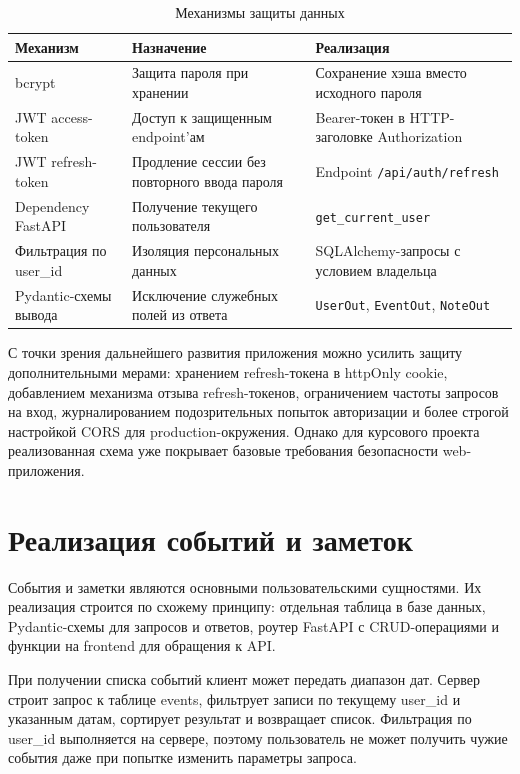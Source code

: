 \documentclass[14pt,a4paper]{extreport}
\begin{document}
\begin{longtable}{|p{}|p{}|p{}|}
\caption{Механизмы защиты данных}\\
\hline
\textbf{Механизм} & \textbf{Назначение} & \textbf{Реализация}\\
\hline
bcrypt & Защита пароля при хранении & Сохранение хэша вместо исходного пароля\\
\hline
JWT access-token & Доступ к защищенным endpoint'ам & Bearer-токен в HTTP-заголовке Authorization\\
\hline
JWT refresh-token & Продление сессии без повторного ввода пароля & Endpoint \texttt{/api/auth/refresh}\\
\hline
Dependency FastAPI & Получение текущего пользователя & \texttt{get\_current\_user}\\
\hline
Фильтрация по user\_id & Изоляция персональных данных & SQLAlchemy-запросы с условием владельца\\
\hline
Pydantic-схемы вывода & Исключение служебных полей из ответа & \texttt{UserOut}, \texttt{EventOut}, \texttt{NoteOut}\\
\hline
\end{longtable}

С точки зрения дальнейшего развития приложения можно усилить защиту дополнительными мерами: хранением refresh-токена в httpOnly cookie, добавлением механизма отзыва refresh-токенов, ограничением частоты запросов на вход, журналированием подозрительных попыток авторизации и более строгой настройкой CORS для production-окружения. Однако для курсового проекта реализованная схема уже покрывает базовые требования безопасности web-приложения.

\section{Реализация событий и заметок}

События и заметки являются основными пользовательскими сущностями. Их реализация строится по схожему принципу: отдельная таблица в базе данных, Pydantic-схемы для запросов и ответов, роутер FastAPI с CRUD-операциями и функции на frontend для обращения к API.

При получении списка событий клиент может передать диапазон дат. Сервер строит запрос к таблице events, фильтрует записи по текущему user\_id и указанным датам, сортирует результат и возвращает список. Фильтрация по user\_id выполняется на сервере, поэтому пользователь не может получить чужие события даже при попытке изменить параметры запроса.
\end{document}
